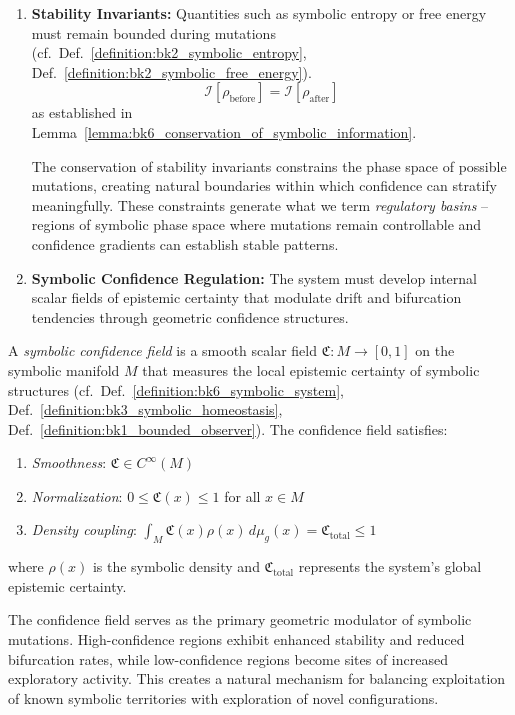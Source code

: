 \begin{enumerate}
\item \textbf{Stability Invariants:} Quantities such as symbolic entropy or free energy must remain bounded during mutations (cf.~Def.~\ref{definition:bk2_symbolic_entropy}, Def.~\ref{definition:bk2_symbolic_free_energy}).
\begin{equation}
\mathcal{I}[\rho_{\text{before}}] = \mathcal{I}[\rho_{\text{after}}]
\end{equation}
as established in Lemma~\ref{lemma:bk6_conservation_of_symbolic_information}.

The conservation of stability invariants constrains the phase space of possible mutations, creating natural boundaries within which confidence can stratify meaningfully. These constraints generate what we term \emph{regulatory basins} -- regions of symbolic phase space where mutations remain controllable and confidence gradients can establish stable patterns.

\item \textbf{Symbolic Confidence Regulation:} The system must develop internal scalar fields of epistemic certainty that modulate drift and bifurcation tendencies through geometric confidence structures.
\end{enumerate}

\begin{definition}
\label{definition:bk6_symbolic_confidence_field}
A \emph{symbolic confidence field} is a smooth scalar field $\mathfrak{C}: M \to [0,1]$ on the symbolic manifold $M$ that measures the local epistemic certainty of symbolic structures (cf.~Def.~\ref{definition:bk6_symbolic_system}, Def.~\ref{definition:bk3_symbolic_homeostasis}, Def.~\ref{definition:bk1_bounded_observer}). The confidence field satisfies:
\begin{enumerate}
\item \emph{Smoothness}: $\mathfrak{C} \in C^\infty(M)$
\item \emph{Normalization}: $0 \leq \mathfrak{C}(x) \leq 1$ for all $x \in M$
\item \emph{Density coupling}: $\int_M \mathfrak{C}(x) \rho(x) \, d\mu_g(x) = \mathfrak{C}_{\text{total}} \leq 1$
\end{enumerate}
where $\rho(x)$ is the symbolic density and $\mathfrak{C}_{\text{total}}$ represents the system's global epistemic certainty.
\end{definition}

The confidence field serves as the primary geometric modulator of symbolic mutations. High-confidence regions exhibit enhanced stability and reduced bifurcation rates, while low-confidence regions become sites of increased exploratory activity. This creates a natural mechanism for balancing exploitation of known symbolic territories with exploration of novel configurations.

